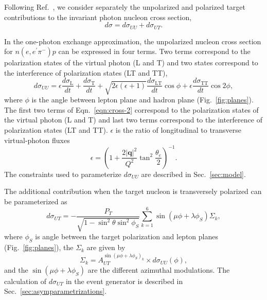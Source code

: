 Following Ref.~\cite{hermes-thesis}, we consider separately the unpolarized and
polarized target contributions to the invariant photon nucleon cross section,
\begin{equation}
  d\sigma = d\sigma_{UU} + d\sigma_{UT}.
  \label{eqn:cross-1}
\end{equation}

In the one-photon exchange approximation, the unpolarized nucleon 
cross section for $n(e,e^{\prime}\pi^{-})p$
can be expressed in four terms. Two terms correspond
to the polarization states of the virtual photon (L and T) and two states
correspond to the interference of polarization states (LT and TT),
\begin{equation}
  d\sigma_{UU} =  \epsilon  \frac{d\sigma_{\mathrm{L}}}{dt}
  + \frac{d\sigma_{\mathrm{T}}}{dt} + 
  \sqrt{2\epsilon (\epsilon +1)} \frac{d\sigma_{\mathrm{LT}}}{dt} \cos{\phi}
  + \epsilon  \frac{d\sigma_{\mathrm{TT}}}{dt} \cos{2 \phi},
  \label{eqn:cross-2}
\end{equation}
where $\phi$ is the angle between lepton plane and hadron plane
(Fig.~\ref{fig:planes}). 
The first two terms of Eqn.~\ref{eqn:cross-2} correspond to the
polarization states of the virtual photon (L and T) and last two terms
correspond to the interference of polarization states (LT and TT).  $\epsilon$
is the ratio of longitudinal to transverse virtual-photon fluxes
\begin{equation}
  \epsilon=\left(1+\frac{2
  |\mathbf{q}|^2}{Q^2} \tan^2\frac{\theta_{e}}{2} \right)^{-1}.
\end{equation}
The constraints used to parameterize $d\sigma_{UU}$ are described in
Sec.~\ref{sec:model}.

The additional contribution when the target nucleon is transversely polarized
can be parameterized \cite{Di05,hermes-thesis} as
\begin{equation}
  d\sigma_{UT} = -\frac{P_{T}}{\sqrt{1 - \sin^{2}{\theta} \sin^{2}{\phi_{S}} }
  } \sum_{k=1}^{6} \sin{ (\mu\phi + \lambda\phi_{S})
  } \Sigma_{k},
\label{eqn:cross-3}
\end{equation}
where $\phi_{S}$ is angle between the target polarization and lepton planes
(Fig.~\ref{fig:planes}), the $\Sigma_{k}$ are given by
\begin{equation}
  \Sigma_{k} = A_{UT}^{\sin{( \mu\phi+\lambda\phi_{S})_{k}}} \times
  d\sigma_{UU}(\phi),
  \label{eqn:sigmas}
\end{equation}
and the $\sin (\mu\phi + \lambda\phi_{S})$ are the different azimuthal
modulations.  The calculation of $d\sigma_{UT}$ in the event generator is
described in Sec.~\ref{sec:asymparametrizations}.

